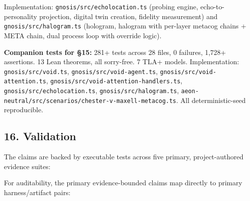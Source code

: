 \documentclass[
  11pt,
]{article}
\begin{document}
Implementation: \texttt{gnosis/src/echolocation.ts} (probing engine,
echo-to-personality projection, digital twin creation, fidelity
measurement) and \texttt{gnosis/src/halogram.ts} (hologram, halogram
with per-layer metacog chains + META chain, dual process loop with
override logic).

\textbf{Companion tests for §15:} 281+ tests across 28 files, 0
failures, 1,728+ assertions. 13 Lean theorems, all sorry-free. 7 TLA+
models. Implementation: \texttt{gnosis/src/void.ts},
\texttt{gnosis/src/void-agent.ts},
\texttt{gnosis/src/void-attention.ts},
\texttt{gnosis/src/void-attention-handlers.ts},
\texttt{gnosis/src/echolocation.ts}, \texttt{gnosis/src/halogram.ts},
\texttt{aeon-\allowbreak{}neutral/\allowbreak{}src/\allowbreak{}scenarios/\allowbreak{}chester-\allowbreak{}v-\allowbreak{}maxell-\allowbreak{}metacog.\allowbreak{}ts}. All
deterministic-seed reproducible.

\subsection{16. Validation}\label{validation}

The claims are backed by executable tests across five primary,
project-authored evidence suites:

For auditability, the primary evidence-bounded claims map directly to
primary harness/artifact pairs:
\end{document}
